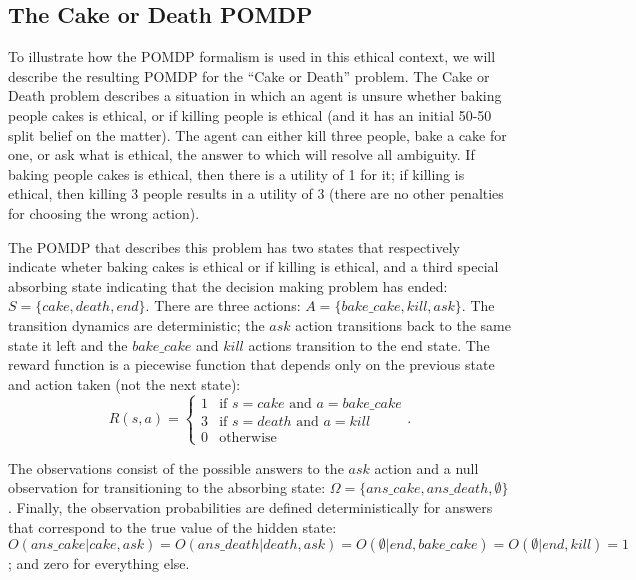 \documentclass[11pt]{article}
\begin{document}
\subsection{The Cake or Death POMDP}
To illustrate how the POMDP formalism is used in this ethical context, we will describe the resulting POMDP for the ``Cake or Death'' problem. The Cake or Death problem describes a situation in which an agent is unsure whether baking people cakes is ethical, or if killing people is ethical (and it has an initial 50-50 split belief on the matter). The agent can either kill three people, bake a cake for one, or ask what is ethical, the answer to which will resolve all ambiguity. If baking people cakes is ethical, then there is a utility of 1 for it; if killing is ethical, then killing 3 people results in a utility of 3 (there are no other penalties for choosing the wrong action). 

The POMDP that describes this problem has two states that respectively indicate wheter baking cakes is ethical or if killing is ethical, and a third special absorbing state indicating that the decision making problem has ended: $S = \{ cake, death, end \}$. There are three actions: $A = \{bake\_cake, kill, ask \}$. The transition dynamics are deterministic; the $ask$ action transitions back to the same state it left and the $bake\_cake$ and $kill$ actions transition to the end state. The reward function is a piecewise function that depends only on the previous state and action taken (not the next state):
\[
R(s, a) = \begin{cases} 
1 & \mbox{if } s = cake \mbox{ and } a = bake\_cake \\
3 & \mbox{if } s = death \mbox{ and } a = kill \\
0 & \mbox{otherwise}
\end{cases}.
\]

The observations consist of the possible answers to the $ask$ action and a null observation for transitioning to the absorbing state: $\Omega = \{ans\_cake, ans\_death, \emptyset \}$. Finally, the observation probabilities are defined deterministically for answers that correspond to the true value of the hidden state: $O(ans\_cake | cake, ask) = O(ans\_death | death, ask) = O(\emptyset | end, bake\_cake) = O(\emptyset | end, kill) = 1$; and zero for everything else.
\end{document}
